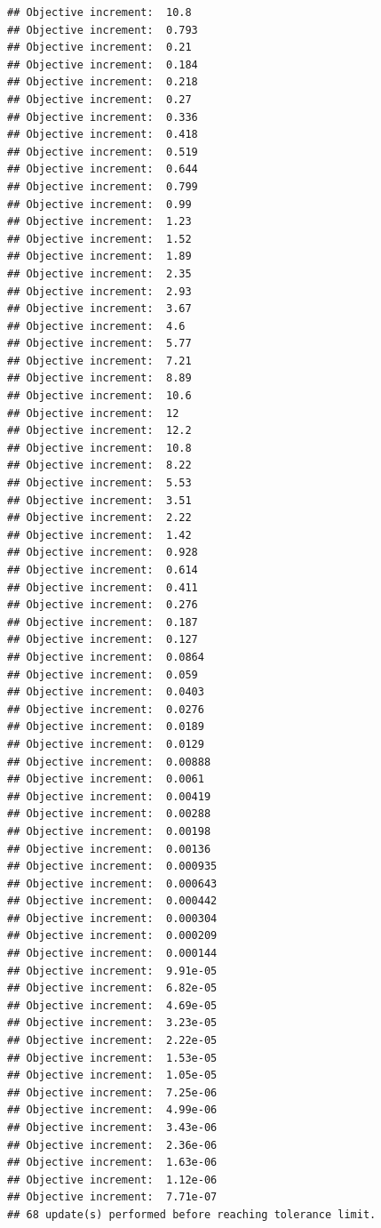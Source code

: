 \documentclass[
]{article}
\begin{document}
\begin{verbatim}
## Objective increment:  10.8 
## Objective increment:  0.793 
## Objective increment:  0.21 
## Objective increment:  0.184 
## Objective increment:  0.218 
## Objective increment:  0.27 
## Objective increment:  0.336 
## Objective increment:  0.418 
## Objective increment:  0.519 
## Objective increment:  0.644 
## Objective increment:  0.799 
## Objective increment:  0.99 
## Objective increment:  1.23 
## Objective increment:  1.52 
## Objective increment:  1.89 
## Objective increment:  2.35 
## Objective increment:  2.93 
## Objective increment:  3.67 
## Objective increment:  4.6 
## Objective increment:  5.77 
## Objective increment:  7.21 
## Objective increment:  8.89 
## Objective increment:  10.6 
## Objective increment:  12 
## Objective increment:  12.2 
## Objective increment:  10.8 
## Objective increment:  8.22 
## Objective increment:  5.53 
## Objective increment:  3.51 
## Objective increment:  2.22 
## Objective increment:  1.42 
## Objective increment:  0.928 
## Objective increment:  0.614 
## Objective increment:  0.411 
## Objective increment:  0.276 
## Objective increment:  0.187 
## Objective increment:  0.127 
## Objective increment:  0.0864 
## Objective increment:  0.059 
## Objective increment:  0.0403 
## Objective increment:  0.0276 
## Objective increment:  0.0189 
## Objective increment:  0.0129 
## Objective increment:  0.00888 
## Objective increment:  0.0061 
## Objective increment:  0.00419 
## Objective increment:  0.00288 
## Objective increment:  0.00198 
## Objective increment:  0.00136 
## Objective increment:  0.000935 
## Objective increment:  0.000643 
## Objective increment:  0.000442 
## Objective increment:  0.000304 
## Objective increment:  0.000209 
## Objective increment:  0.000144 
## Objective increment:  9.91e-05 
## Objective increment:  6.82e-05 
## Objective increment:  4.69e-05 
## Objective increment:  3.23e-05 
## Objective increment:  2.22e-05 
## Objective increment:  1.53e-05 
## Objective increment:  1.05e-05 
## Objective increment:  7.25e-06 
## Objective increment:  4.99e-06 
## Objective increment:  3.43e-06 
## Objective increment:  2.36e-06 
## Objective increment:  1.63e-06 
## Objective increment:  1.12e-06 
## Objective increment:  7.71e-07 
## 68 update(s) performed before reaching tolerance limit.
\end{verbatim}
\end{document}
